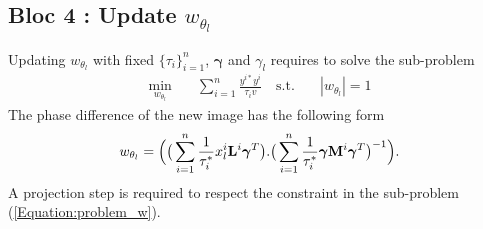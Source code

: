     \subsection*{\textbf{Bloc 4 : Update $w_{\theta_{l}}$}}
        \label{subsection:update_w_theta}
        \noindent
        Updating $w_{\theta_{l}}$ with fixed $\{\tau_i\}_{i=1}^n$, $\boldsymbol{\gamma}$ and $\gamma_{l}$ requires to solve the sub-problem 
        \vspace{-0.5em}
        \begin{equation}
            \label{Equation:problem_w}
            \begin{aligned}
                \min_{w_{\theta_l}} \quad & \sum_{i=1}^n  \frac{y^{i*} y^i}{\tau_i v}  %
            \quad \text{s.t.} \quad & |w_{\theta_{l}}| = 1 %
            \end{aligned}
        \end{equation}
        The phase difference of the new image has the following form
        \vspace{-0.7em}
        \begin{equation}
            \label{Equation:newPhase}
            \small w_{\theta_l} = \small \Big( \big(\sum_{i=1}^n \frac{1}{\tau_i^*} x_{l}^{i} \mathbf{L}^i \boldsymbol{\gamma}^T \big) . \big(\sum_{i=1}^n \frac{1}{\tau_i^*} \boldsymbol{\gamma} \mathbf{M}^i \boldsymbol{\gamma}^T \big)^{-1}\Big). %
        \end{equation}
        A projection step is required to respect the constraint in the sub-problem (\ref{Equation:problem_w}).%
        
